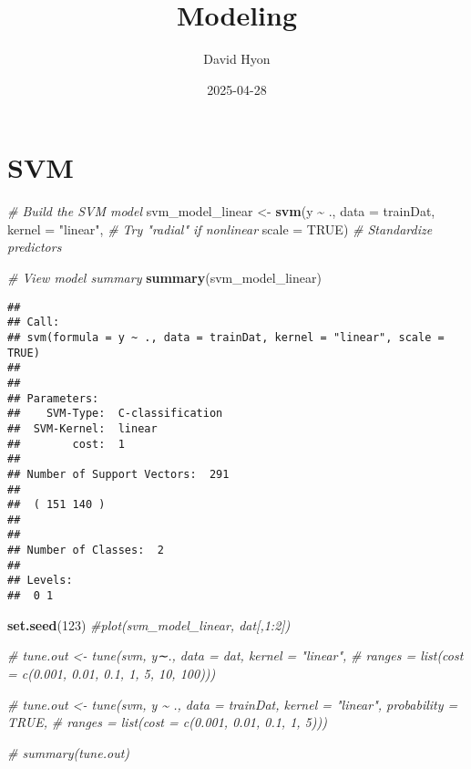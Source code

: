 \documentclass[
]{article}
\title{Modeling}
\author{David Hyon}
\date{2025-04-28}
\newenvironment{Shaded}{\begin{snugshade}}{\end{snugshade}}
\newcommand{\AttributeTok}[1]{\textcolor[rgb]{0.13,0.29,0.53}{#1}}
\newcommand{\CommentTok}[1]{\textcolor[rgb]{0.56,0.35,0.01}{\textit{#1}}}
\newcommand{\ConstantTok}[1]{\textcolor[rgb]{0.56,0.35,0.01}{#1}}
\newcommand{\DecValTok}[1]{\textcolor[rgb]{0.00,0.00,0.81}{#1}}
\newcommand{\FunctionTok}[1]{\textcolor[rgb]{0.13,0.29,0.53}{\textbf{#1}}}
\newcommand{\NormalTok}[1]{#1}
\newcommand{\OtherTok}[1]{\textcolor[rgb]{0.56,0.35,0.01}{#1}}
\newcommand{\SpecialCharTok}[1]{\textcolor[rgb]{0.81,0.36,0.00}{\textbf{#1}}}
\newcommand{\StringTok}[1]{\textcolor[rgb]{0.31,0.60,0.02}{#1}}
\begin{document}
\maketitle

\section{SVM}\label{svm}

\begin{Shaded}
\begin{Highlighting}[]
\CommentTok{\# Build the SVM model}
\NormalTok{svm\_model\_linear }\OtherTok{\textless{}{-}} \FunctionTok{svm}\NormalTok{(y }\SpecialCharTok{\textasciitilde{}}\NormalTok{ ., }\AttributeTok{data =}\NormalTok{ trainDat, }
                 \AttributeTok{kernel =} \StringTok{"linear"}\NormalTok{,   }\CommentTok{\# Try "radial" if nonlinear}
                 \AttributeTok{scale =} \ConstantTok{TRUE}\NormalTok{)        }\CommentTok{\# Standardize predictors}

\CommentTok{\# View model summary}
\FunctionTok{summary}\NormalTok{(svm\_model\_linear)}
\end{Highlighting}
\end{Shaded}

\begin{verbatim}
## 
## Call:
## svm(formula = y ~ ., data = trainDat, kernel = "linear", scale = TRUE)
## 
## 
## Parameters:
##    SVM-Type:  C-classification 
##  SVM-Kernel:  linear 
##        cost:  1 
## 
## Number of Support Vectors:  291
## 
##  ( 151 140 )
## 
## 
## Number of Classes:  2 
## 
## Levels: 
##  0 1
\end{verbatim}

\begin{Shaded}
\begin{Highlighting}[]
\FunctionTok{set.seed}\NormalTok{(}\DecValTok{123}\NormalTok{)}
\CommentTok{\#plot(svm\_model\_linear, dat[,1:2])}


\CommentTok{\# tune.out \textless{}{-} tune(svm, y∼., data = dat, kernel = "linear",}
\CommentTok{\#   ranges = list(cost = c(0.001, 0.01, 0.1, 1, 5, 10, 100)))}

\CommentTok{\# tune.out \textless{}{-} tune(svm, y \textasciitilde{} ., data = trainDat, kernel = "linear", probability = TRUE, }
\CommentTok{\#                  ranges = list(cost = c(0.001, 0.01, 0.1, 1, 5)))}
\end{Highlighting}
\end{Shaded}

\begin{Shaded}
\begin{Highlighting}[]
\CommentTok{\# summary(tune.out)}
\end{Highlighting}
\end{Shaded}
\end{document}
